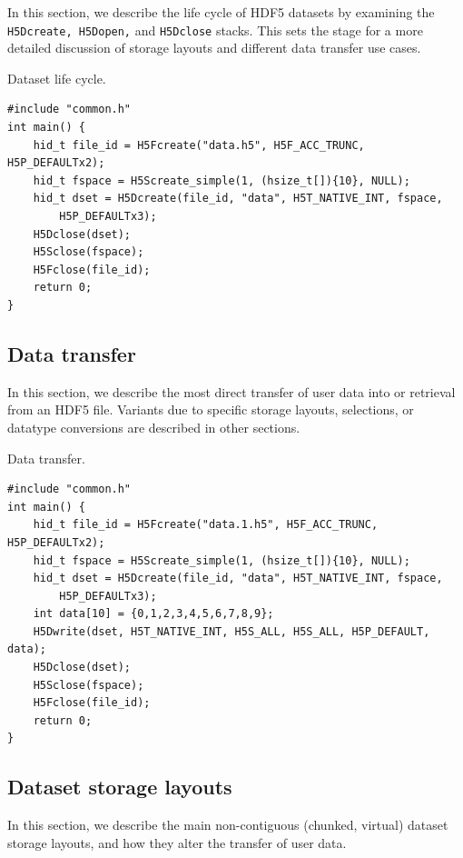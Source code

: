 In this section, we describe the life cycle of HDF5 datasets by examining the \texttt{H5Dcreate, H5Dopen,} and \texttt{H5Dclose} stacks. This sets the stage for a more detailed discussion of storage layouts and different data transfer use cases.

\begin{listing}
\centering
\caption{Dataset life cycle.}
\label{lst:dataset-life-cycle}
\begin{verbatim}
#include "common.h"
int main() {
    hid_t file_id = H5Fcreate("data.h5", H5F_ACC_TRUNC, H5P_DEFAULTx2);
    hid_t fspace = H5Screate_simple(1, (hsize_t[]){10}, NULL);
    hid_t dset = H5Dcreate(file_id, "data", H5T_NATIVE_INT, fspace,
        H5P_DEFAULTx3);
    H5Dclose(dset);
    H5Sclose(fspace);
    H5Fclose(file_id);
    return 0;
}
\end{verbatim}
\end{listing}

\subsection{Data transfer}

In this section, we describe the most direct transfer of user data into or retrieval from an HDF5 file. Variants due to specific storage layouts, selections, or datatype conversions are described in other sections.

\begin{listing}
\centering
\caption{Data transfer.}
\label{lst:dataset-transfer}
\begin{verbatim}
#include "common.h"
int main() {
    hid_t file_id = H5Fcreate("data.1.h5", H5F_ACC_TRUNC, H5P_DEFAULTx2);
    hid_t fspace = H5Screate_simple(1, (hsize_t[]){10}, NULL);
    hid_t dset = H5Dcreate(file_id, "data", H5T_NATIVE_INT, fspace,
        H5P_DEFAULTx3);
    int data[10] = {0,1,2,3,4,5,6,7,8,9};
    H5Dwrite(dset, H5T_NATIVE_INT, H5S_ALL, H5S_ALL, H5P_DEFAULT, data);
    H5Dclose(dset);
    H5Sclose(fspace);
    H5Fclose(file_id);
    return 0;
}
\end{verbatim}
\end{listing}

\subsection{Dataset storage layouts}\label{sec:layouts}

In this section, we describe the main non-contiguous (chunked, virtual) dataset storage layouts, and how they alter the transfer of user data.

